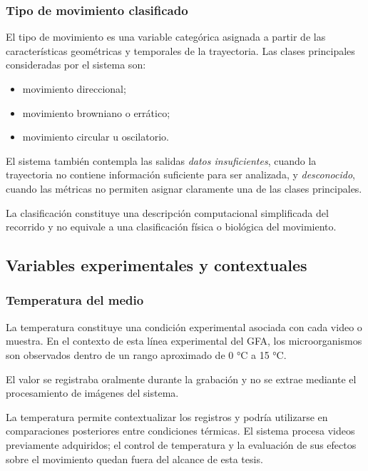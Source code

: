 \subsubsection{Tipo de movimiento clasificado}

El tipo de movimiento es una variable categórica asignada a partir de las características geométricas y temporales de la trayectoria. Las clases principales consideradas por el sistema son:

\begin{itemize}
  \item movimiento direccional;
  \item movimiento browniano o errático;
  \item movimiento circular u oscilatorio.
\end{itemize}

El sistema también contempla las salidas \textit{datos insuficientes}, cuando la trayectoria no contiene información suficiente para ser analizada, y \textit{desconocido}, cuando las métricas no permiten asignar claramente una de las clases principales.

La clasificación constituye una descripción computacional simplificada del recorrido y no equivale a una clasificación física o biológica del movimiento.

\subsection{Variables experimentales y contextuales}

\subsubsection{Temperatura del medio}

La temperatura constituye una condición experimental asociada con cada video o muestra. En el contexto de esta línea experimental del GFA, los microorganismos son observados dentro de un rango aproximado de 0 °C a 15 °C.

El valor se registraba oralmente durante la grabación y no se extrae mediante el procesamiento de imágenes del sistema.

La temperatura permite contextualizar los registros y podría utilizarse en comparaciones posteriores entre condiciones térmicas. El sistema procesa videos previamente adquiridos; el control de temperatura y la evaluación de sus efectos sobre el movimiento quedan fuera del alcance de esta tesis.

